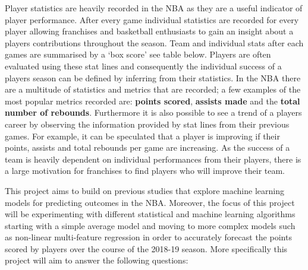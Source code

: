 \documentclass[a4paper,11pt,twoside]{article}
\begin{document}
Player statistics are heavily recorded in the NBA as they are a useful indicator of player performance. After every game individual statistics are recorded for every player allowing franchises and basketball enthusiasts to gain an insight about a players contributions throughout the season. Team and individual stats after each games are summarised by a `box score' see table below. Players are often evaluated using these stat lines and consequently the individual success of a players season can be defined by inferring from their statistics. In the NBA there are a multitude of statistics and metrics that are recorded; a few examples of the most popular metrics recorded are: \textbf{points scored}, \textbf{assists made} and the \textbf{total number of rebounds}. Furthermore it is also possible to see a trend of a players career by observing the information provided by stat lines from their previous games. For example, it can be speculated that a player is improving if their points, assists and total rebounds per game are increasing. As the success of a team is heavily dependent on individual performances from their players, there is a large motivation for franchises to find players who will improve their team. %
\vspace{5mm}
\begin{center}
\end{center}
\vspace{5mm}
This project aims to build on previous studies that explore machine learning models for predicting outcomes in the NBA. Moreover, the focus of this project will be experimenting with different statistical and machine learning algorithms starting with a simple average model and moving to more complex models such as non-linear multi-feature regression in order to accurately forecast the points scored by players over the course of the 2018-19 season. More specifically this project will aim to answer the following questions:
\end{document}
